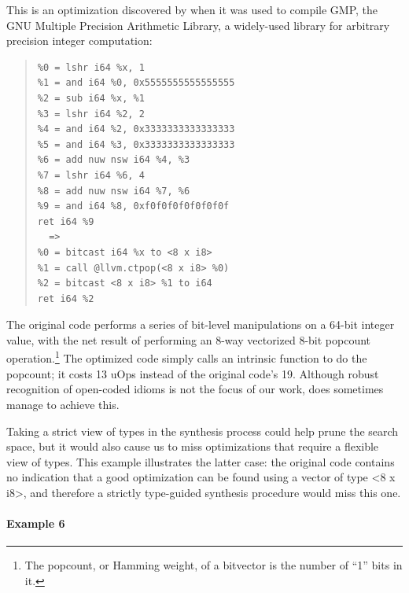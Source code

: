 This is an optimization discovered
by \minotaur{} when it was used to compile GMP, the GNU Multiple Precision
Arithmetic Library, a widely-used library for arbitrary precision
integer computation:


{\begin{quote}\begin{verbatim}
%0 = lshr i64 %x, 1
%1 = and i64 %0, 0x5555555555555555
%2 = sub i64 %x, %1
%3 = lshr i64 %2, 2
%4 = and i64 %2, 0x3333333333333333
%5 = and i64 %3, 0x3333333333333333
%6 = add nuw nsw i64 %4, %3
%7 = lshr i64 %6, 4
%8 = add nuw nsw i64 %7, %6
%9 = and i64 %8, 0xf0f0f0f0f0f0f0f
ret i64 %9
  =>
%0 = bitcast i64 %x to <8 x i8>
%1 = call @llvm.ctpop(<8 x i8> %0)
%2 = bitcast <8 x i8> %1 to i64
ret i64 %2
\end{verbatim}
\end{quote}}

%
%
The original code performs a series of bit-level
manipulations on a 64-bit integer value, with the net result of
performing an 8-way vectorized 8-bit popcount operation.\footnote{The
popcount, or Hamming weight, of a bitvector is the number of ``1''
bits in it.}
%
The optimized code simply calls an intrinsic function to do the
popcount; it costs 13 uOps instead of the original code's 19.
%
Although robust recognition of open-coded idioms is not the focus
of our work, \minotaur{} does sometimes manage to achieve this.

Taking a strict view of types in the synthesis process could help
prune the search space, but it would also cause us to miss
optimizations that require a flexible view of types.
%
This example illustrates the latter case: the original code contains
no indication that a good optimization can be found using a vector of
type <8 x i8>, and therefore a strictly type-guided synthesis
procedure would miss this one.

\paragraph*{Example 6}

